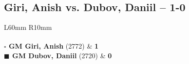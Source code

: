 \documentclass[../main.tex]{subfiles}
\begin{document}
\subsection{Giri, Anish vs. Dubov, Daniil -- 1-0}

\begin{multicols*}{2}

\begin{tabular}{L{60mm} R{10mm}}
\\ 
\\[3mm]
\textbf{$\square$ \hspace{2mm}  GM Giri, Anish} (2772)  & \textbf{1}\\ 
\textbf{$\blacksquare$ \hspace{2mm}  GM Dubov, Daniil} (2720)  & \textbf{0}\\ 
\end{tabular}

\end{multicols*}
\newpage
\end{document}
